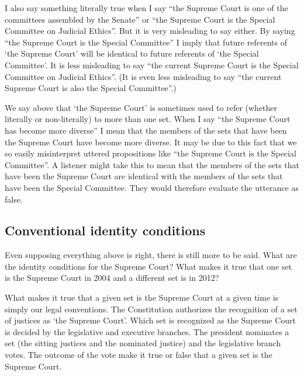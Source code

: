 \documentclass[11pt]{article}
\begin{document}
\begin{spacing}{1.5}
I also say something literally true when I say ``the Supreme Court is
one of the committees assembled by the Senate'' or ``the Supreme Court
is the Special Committee on Judicial Ethics''.  But it is very
misleading to say either.  By saying ``the Supreme Court is the
Special Committee'' I imply that future referents of `the Supreme
Court' will be identical to future referents of `the Special
Committee'.  It is less misleading to say ``the current Supreme Court
is the Special Committee on Judicial Ethics''.  (It is even less
misleading to say ``the current Supreme Court is also the Special
Committee''.)

We say above that `the Supreme Court' is sometimes used to refer
(whether literally or non-literally) to more than one set.  When I say
``the Supreme Court has become more diverse'' I mean that the members
of the sets that have been the Supreme Court have become more diverse.
It may be due to this fact that we so easily misinterpret uttered
propositions like ``the Supreme Court is the Special Committee''.  A
listener might take this to mean that the members of the sets that
have been the Supreme Court are identical with the members of the sets
that have been the Special Committee.  They would therefore evaluate
the utterance as false.


\subsection{Conventional identity conditions}
\label{set-convention}
Even supposing everything above is right, there is still more to be
said.  What are the identity conditions for the Supreme Court?  What
makes it true that one set is the Supreme Court in 2004 and a
different set is in 2012?

What makes it true that a given set is the Supreme Court at a given
time is simply our legal conventions.  The Constitution authorizes the
recognition of a set of justices as `the Supreme Court'.  Which set is
recognized as the Supreme Court is decided by the legislative and
executive branches.  The president nominates a set (the sitting
justices and the nominated justice) and the legislative branch votes.
The outcome of the vote make it true or false that a given set is the
Supreme Court.


\end{spacing}
\end{document}
